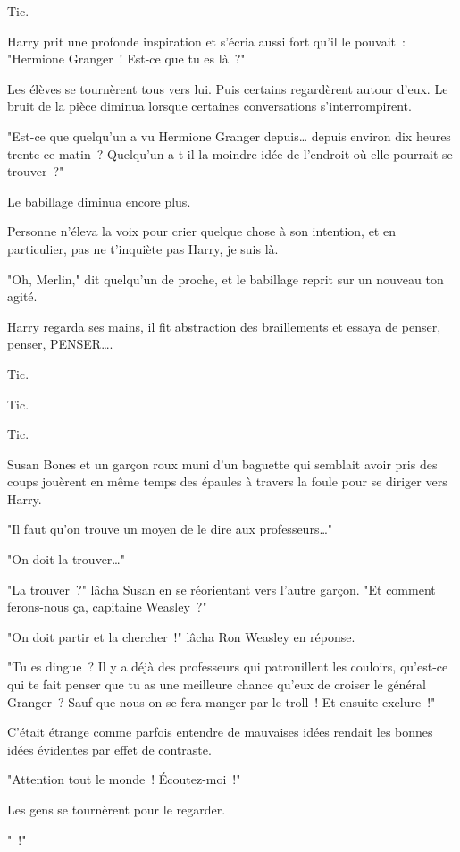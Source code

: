 Tic.

Harry prit une profonde inspiration et s'écria aussi fort qu'il le pouvait~: "Hermione Granger~! Est-ce que tu es là~?"

Les élèves se tournèrent tous vers lui. Puis certains regardèrent autour d'eux. Le bruit de la pièce diminua lorsque certaines conversations s'interrompirent.

"Est-ce que quelqu'un a vu Hermione Granger depuis… depuis environ dix heures trente ce matin~? Quelqu'un a-t-il la moindre idée de l'endroit où elle pourrait se trouver~?"

Le babillage diminua encore plus.

Personne n'éleva la voix pour crier quelque chose à son intention, et en particulier, pas ne t'inquiète pas Harry, je suis là.

"Oh, Merlin," dit quelqu'un de proche, et le babillage reprit sur un nouveau ton agité.

Harry regarda ses mains, il fit abstraction des braillements et essaya de penser, penser, PENSER….

Tic.

Tic.

Tic.

Susan Bones et un garçon roux muni d'un baguette qui semblait avoir pris des coups jouèrent en même temps des épaules à travers la foule pour se diriger vers Harry.

"Il faut qu'on trouve un moyen de le dire aux professeurs…"

"On doit la trouver…"

"La trouver~?" lâcha Susan en se réorientant vers l'autre garçon. "Et comment ferons-nous ça, capitaine Weasley~?"

"On doit partir et la chercher~!" lâcha Ron Weasley en réponse.

"Tu es dingue~? Il y a déjà des professeurs qui patrouillent les couloirs, qu'est-ce qui te fait penser que tu as une meilleure chance qu'eux de croiser le général Granger~? Sauf que nous on se fera manger par le troll~! Et ensuite exclure~!"

C'était étrange comme parfois entendre de mauvaises idées rendait les bonnes idées évidentes par effet de contraste.

"Attention tout le monde~! Écoutez-moi~!"

Les gens se tournèrent pour le regarder.

"~!"

